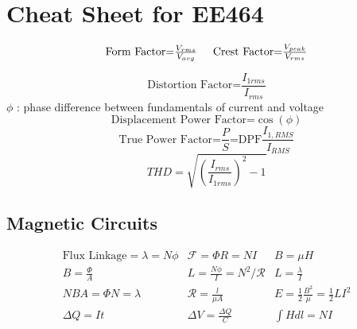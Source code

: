 \documentclass[twocolumn]{article}
\begin{document}
\section*{\normalsize Cheat Sheet for EE464}
\small \begin{equation*}
\textrm{Form Factor=}\textstyle\frac{V_{rms}}{V_{avg}} \hspace{0.5cm}
\textrm{Crest Factor=}\textstyle\frac{V_{peak}}{V_{rms}}
\end{equation*}

\begin{equation*}
\textrm{Distortion Factor=}\frac{I_{1rms}}{I_{rms}}
\end{equation*}
\textrm{$\phi$ : phase difference between fundamentals of current and voltage}
\begin{equation*}
\textrm{Displacement Power Factor=}\cos(\phi)
\end{equation*}
\begin{equation*}
\textstyle \textrm{True Power Factor=} \frac{P}{S}\textrm{=DPF} \frac{I_{1,RMS}}{I_{RMS}}
\end{equation*}
\begin{equation*}
\textstyle THD=\sqrt{(\frac{I_{rms}}{I_{1rms}})^2-1}
\end{equation*}

\vspace*{-0.55cm}
\subsection*{\small Magnetic Circuits}
\vspace*{-0.1cm}
\begin{equation*}
\begin{array}{c|c|c}
\textstyle \textrm{Flux Linkage}=\lambda=N\phi & \textstyle \mathcal{F}=\Phi R  = NI & \textstyle B = \mu H \\
\textstyle B = \frac{\Phi}{A} & \textstyle L=\frac{N\phi}{I} = N^2 /\mathcal{R} & \textstyle L=\frac{\lambda}{I}\\
\textstyle N B A = \Phi N = \lambda & \textstyle \mathcal{R}=\frac{l}{\mu A} & E = \frac{1}{2} \frac{B^2}{\mu} = \frac{1}{2} L I^2\\
\textstyle \Delta Q = I t & \textstyle \Delta V =  \frac{\Delta Q}{C} & \int H dl = NI\\
\end{array}
\end{equation*}

\vspace*{-0.4cm}
\end{document}
